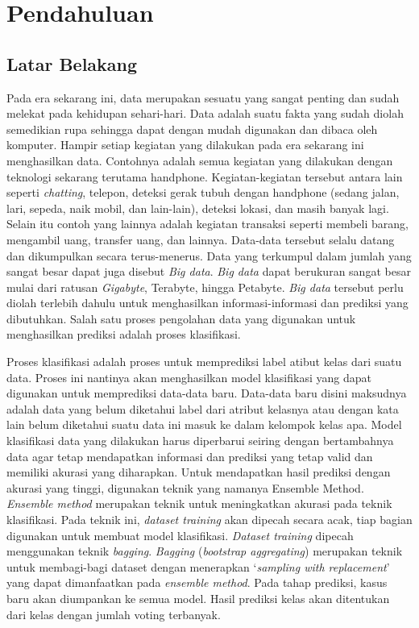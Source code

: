 \chapter{Pendahuluan}
\label{chap:intro}
   
\section{Latar Belakang}
\label{sec:label}
Pada era sekarang ini, data merupakan sesuatu yang sangat penting dan sudah melekat pada kehidupan sehari-hari. Data adalah suatu fakta yang sudah diolah semedikian rupa sehingga dapat dengan mudah digunakan dan dibaca oleh komputer. Hampir setiap kegiatan yang dilakukan pada era sekarang ini menghasilkan data. Contohnya adalah semua kegiatan yang dilakukan dengan teknologi sekarang terutama handphone. Kegiatan-kegiatan tersebut antara lain seperti \textit{chatting}, telepon, deteksi gerak tubuh dengan handphone (sedang jalan, lari, sepeda, naik mobil, dan lain-lain), deteksi lokasi, dan masih banyak lagi. Selain itu contoh yang lainnya adalah kegiatan transaksi seperti membeli barang, mengambil uang, transfer uang, dan lainnya. Data-data tersebut selalu datang dan dikumpulkan secara terus-menerus. Data yang terkumpul dalam jumlah yang sangat besar dapat juga disebut \textit{Big data}. \textit{Big data} dapat berukuran sangat besar mulai dari ratusan \textit{Gigabyte}, Terabyte, hingga Petabyte. \textit{Big data} tersebut perlu diolah terlebih dahulu  untuk menghasilkan informasi-informasi dan prediksi yang dibutuhkan. Salah satu proses pengolahan data yang digunakan untuk menghasilkan prediksi adalah proses klasifikasi. 

Proses klasifikasi adalah proses untuk memprediksi label atibut kelas dari suatu data. Proses ini nantinya akan menghasilkan model klasifikasi yang dapat digunakan untuk memprediksi data-data baru. Data-data baru disini maksudnya adalah data yang belum diketahui label dari atribut kelasnya atau dengan kata lain belum diketahui suatu data ini masuk ke dalam kelompok kelas apa. Model klasifikasi data yang dilakukan harus diperbarui seiring dengan bertambahnya data agar tetap mendapatkan informasi dan prediksi yang tetap valid dan memiliki akurasi yang diharapkan. Untuk mendapatkan hasil prediksi dengan akurasi yang tinggi, digunakan teknik yang namanya Ensemble Method. \textit{Ensemble method} merupakan teknik untuk meningkatkan akurasi pada teknik klasifikasi. Pada teknik ini, \textit{dataset training} akan dipecah secara acak, tiap bagian digunakan untuk membuat model klasifikasi. \textit{Dataset training} dipecah menggunakan teknik \textit{bagging}. \textit{Bagging} (\textit{bootstrap aggregating}) merupakan teknik untuk membagi-bagi dataset dengan menerapkan ‘\textit{sampling with replacement}’ yang dapat dimanfaatkan pada \textit{ensemble method}. Pada tahap prediksi, kasus baru akan diumpankan ke semua model. Hasil prediksi kelas akan ditentukan dari kelas dengan jumlah voting terbanyak.


